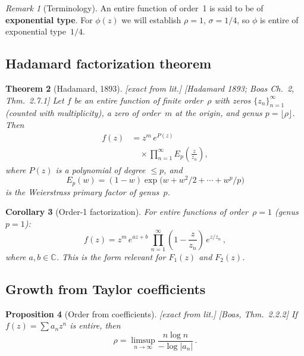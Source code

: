 \documentclass[12pt,a4paper]{article}
\newtheorem{proposition}{Proposition}[section]
\newtheorem{corollary}[proposition]{Corollary}
\newtheorem{theorem}[proposition]{Theorem}
\theoremstyle{definition}
\theoremstyle{remark}
\newtheorem{remark}[proposition]{Remark}
\newcommand{\fromlit}[1]{\textcolor{blue!70!black}{\textsf{[#1]}}}
\newcommand{\exactlit}{\textcolor{blue!60!black}{\textsf{[exact from lit.]}}}
\begin{document}
\begin{remark}[Terminology]
An entire function of order~1 is said to be of
\textbf{exponential type}.  For $\phi(z)$ we will establish
$\rho = 1$, $\sigma = 1/4$, so $\phi$ is entire of exponential
type~$1/4$.
\end{remark}


\subsection{Hadamard factorization theorem}

\begin{theorem}[Hadamard, 1893]
\label{thm:hadamard}
\exactlit\;
\fromlit{Hadamard 1893; Boas Ch.~2, Thm.~2.7.1}
Let $f$ be an entire function of finite order~$\rho$ with zeros
$\{z_n\}_{n=1}^\infty$ (counted with multiplicity), a zero of
order~$m$ at the origin, and genus
$p = \lfloor\rho\rfloor$.  Then
\begin{equation}
  \begin{aligned}
    f(z) &= z^m\, e^{P(z)} \\
         &\quad \times \prod_{n=1}^\infty E_p\!\left(\frac{z}{z_n}\right),
  \end{aligned}
  \label{eq:hadamard}
\end{equation}
where $P(z)$ is a polynomial of degree $\leq p$, and
\begin{equation}
  E_p(w) = (1-w)\exp\!\bigl(w + w^2/2 + \cdots + w^p/p\bigr)
  \label{eq:weierstrass-primary}
\end{equation}
is the Weierstrass primary factor of genus~$p$.
\end{theorem}

\begin{corollary}[Order-1 factorization]
For entire functions of order~$\rho = 1$ (genus $p = 1$):
\begin{equation}
  f(z) = z^m\, e^{az+b}\, \prod_{n=1}^\infty
  \left(1 - \frac{z}{z_n}\right)\,
  e^{z/z_n}\,,
  \label{eq:hadamard-order1}
\end{equation}
where $a,b\in\mathbb{C}$.
This is the form relevant for $F_1(z)$ and $F_2(z)$.
\end{corollary}


\subsection{Growth from Taylor coefficients}

\begin{proposition}[Order from coefficients]
\label{prop:order-coefficients}
\exactlit\;
\fromlit{Boas, Thm.~2.2.2}
If $f(z) = \sum a_n z^n$ is entire, then
\begin{equation}
  \rho = \limsup_{n\to\infty}
  \frac{n\log n}{-\log|a_n|}\,.
  \label{eq:order-from-coeffs}
\end{equation}
\end{proposition}
\end{document}
